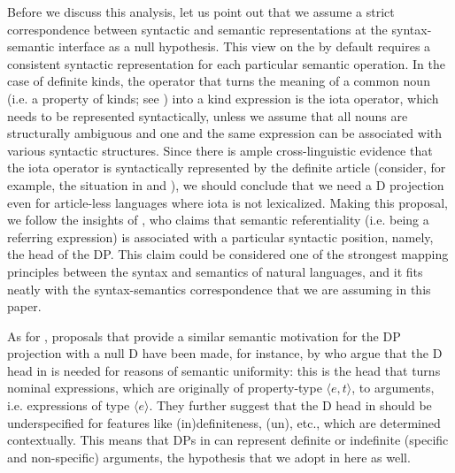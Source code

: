 \documentclass[output=paper
,modfonts
,nonflat]{langsci/langscibook}
\begin{document}
	Before we discuss this analysis, let us point out that we assume a strict correspondence between syntactic and semantic representations at the syntax\hyp{}semantic interface as a null hypothesis. This view on the  by default requires a consistent syntactic representation for each particular semantic operation. In the case of definite kinds, the operator that turns the meaning of a common noun (i.e. a property of kinds; see ) into a kind expression is the iota operator, which needs to be represented syntactically, unless we assume that all nouns are structurally ambiguous and one and the same expression can be associated with various syntactic structures. Since there is ample cross-linguistic evidence that the iota operator is syntactically represented by the definite article (consider, for example, the situation in  and ), we should conclude that we need a D projection even for article-less languages where iota is not lexicalized. Making this proposal, we follow the insights of \citet{Longobardi1994, Longobardi2001, Longobardi2005}, who claims that semantic referentiality (i.e. being a referring expression) is associated with a particular syntactic position, namely, the head of the DP. This claim could be considered one of the strongest mapping principles between the syntax and semantics of natural languages, and it fits neatly with the syntax-semantics correspondence that we are assuming in this paper. 
	
	As for , proposals that provide a similar semantic motivation for the DP projection with a null D have been made, for instance, by \citet{Ramchand2008} who argue that the D head in  is needed for reasons of semantic uniformity: this is the head that turns nominal expressions, which are originally of property-type $\langle e,t\rangle$, to arguments, i.e. expressions of type $\langle e\rangle$. They further suggest that the D head in  should be underspecified for features like (in)definiteness, (un), etc., which are determined contextually. This means that DPs in  can represent definite or indefinite (specific and non-specific) arguments, the hypothesis that we adopt in here as well.
	
\end{document}
